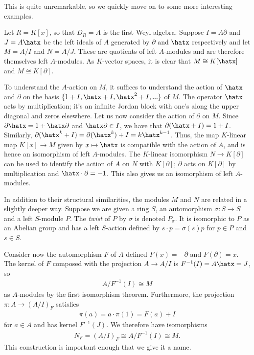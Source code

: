 This is quite unremarkable, so we quickly move on to some more interesting examples.
\begin{example}\label{example:d-mod-quotient-by-x-and-partial}
	Let $R = K[x]$, so that $D_R = A$ is the first Weyl algebra. Suppose $I = A\partial$ and $J = A\hatx$ be the left ideals of $A$ generated by $\partial$ and $\hatx$ respectively and let $M = A/I$ and $N = A/J$. These are quotients of left $A$-modules and are therefore themselves left $A$-modules. As $K$-vector spaces, it is clear that $M \cong K[\hatx]$ and $M \cong K[\partial]$.

	To understand the $A$-action on $M$, it suffices to understand the action of $\hatx$ and $\partial$ on the basis $\{1+I,\hatx + I,\hatx^2 + I,...\}$ of $M$. The operator $\hatx$ acts by multiplication; it's an infinite Jordan block with one's along the upper diagonal and zeros elsewhere. Let us now consider the action of $\partial$ on $M$. Since $\partial\hatx = 1 + \hatx\partial$ and $\hatx\partial \in I$, we have that $\partial(\hatx + I) = 1 + I$. Similarly, $\partial(\hatx^k + I) = \partial(\hatx^k) + I = k\hatx^{k-1}$. Thus, the map $K$-linear map $K[x]\to M$ given by $x\mapsto \hatx$ is compatible with the action of $A$, and is hence an isomorphism of left $A$-modules. The $K$-linear isomorphism $N\to K[\partial]$ can be used to identify the action of $A$ on $N$ with $K[\partial]$; $\partial$ acts on $K[\partial]$ by multiplication and $\hatx\cdot \partial = -1$. This also gives us an isomorphism of left $A$-modules.

	In addition to their structural similarities, the modules $M$ and $N$ are related in a slightly deeper way. Suppose we are given a ring $S$, an automorphism $\sigma:S\to S$ and a left $S$-module $P$. The \emph{twist} of $P$ by $\sigma$ is denoted $P_\sigma$. It is isomorphic to $P$ as an Abelian group and has a left $S$-action defined by $s\cdot p = \sigma(s)p$ for $p\in P$ and $s\in S$.

	Consider now the automorphism $F$ of $A$ defined $F(x) = -\partial$ and $F(\partial) = x$. The kernel of $F$ composed with the projection $A\to A/I$ is $F^{-1}(I) = A\hatx = J$, so
	\begin{align*}
		A/F^{-1}(I) \cong M
	\end{align*}
	as $A$-modules by the first isomorphism theorem. Furthermore, the projection $\pi: A\to (A/I)_F$ satisfies
	\begin{align*}
		\pi(a) = a\cdot \pi(1) = F(a) + I
	\end{align*}
	for $a \in A$ and has kernel $F^{-1}(J)$. We therefore have isomorphisms
	\begin{align*}
		N_F = (A/I)_F \cong A/F^{-1}(I) \cong M.
	\end{align*}
	This construction is important enough that we give it a name.
\end{example}
